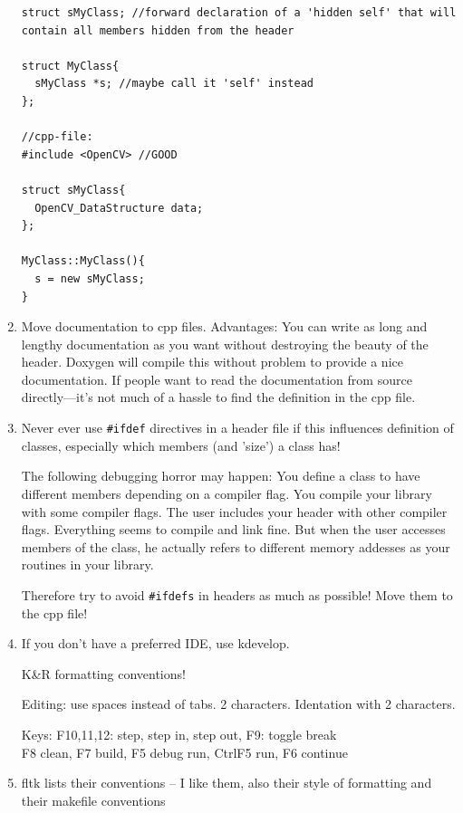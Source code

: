 \begin{enumerate}
\begin{code}
\begin{verbatim}
struct sMyClass; //forward declaration of a 'hidden self' that will
contain all members hidden from the header

struct MyClass{
  sMyClass *s; //maybe call it 'self' instead
};

//cpp-file:
#include <OpenCV> //GOOD

struct sMyClass{
  OpenCV_DataStructure data;
};

MyClass::MyClass(){
  s = new sMyClass;
}
\end{verbatim}
\end{code}

\item Move documentation to cpp files. Advantages: You can write as
  long and lengthy documentation as you want without destroying the
  beauty of the header. Doxygen will compile this without problem to
  provide a nice documentation. If people want to read the
  documentation from source directly---it's not much of a hassle to
  find the definition in the cpp file.


\item Never ever use \verb+#ifdef+ directives in a header file if this
  influences definition of classes, especially which members (and
  'size') a class has!

  The following debugging horror may happen: You define a class to
  have different members depending on a compiler flag. You compile
  your library with some compiler flags. The user includes your header
  with other compiler flags. Everything seems to compile and link
  fine. But when the user accesses members of the class, he actually
  refers to different memory addesses as your routines in your
  library.

  Therefore try to avoid \verb+#ifdefs+ in headers as much as possible! Move
  them to the cpp file!

\item If you don't have a preferred IDE, use kdevelop.

  K\&R formatting conventions!

  Editing: use spaces instead of tabs. 2 characters. Identation with 2
  characters.

  Keys: F10,11,12: step, step in, step out, F9: toggle break\\
  F8 clean, F7 build, F5 debug run, CtrlF5 run, F6 continue


\item fltk lists their conventions -- I like them, also
  their style of formatting and their makefile conventions

\end{enumerate}





